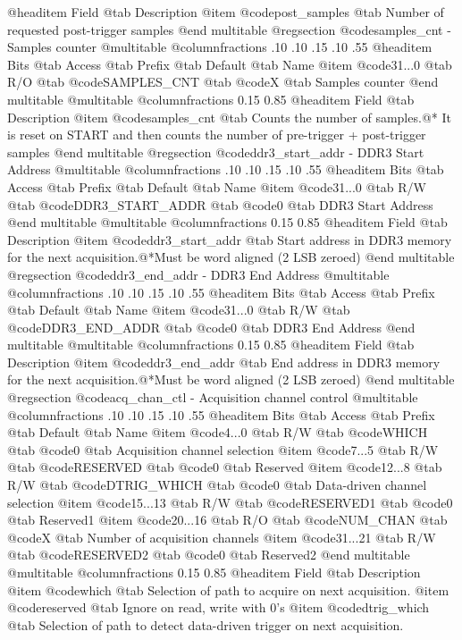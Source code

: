 @headitem Field @tab Description
@item @code{post_samples} @tab Number of requested post-trigger samples
@end multitable
@regsection @code{samples_cnt} - Samples counter
@multitable @columnfractions .10 .10 .15 .10 .55
@headitem Bits @tab Access @tab Prefix @tab Default @tab Name
@item @code{31...0}
@tab R/O @tab
@code{SAMPLES_CNT}
@tab @code{X} @tab 
Samples counter
@end multitable
@multitable @columnfractions 0.15 0.85
@headitem Field @tab Description
@item @code{samples_cnt} @tab Counts the number of samples.@* It is reset on START and then counts the number of pre-trigger + post-trigger samples
@end multitable
@regsection @code{ddr3_start_addr} - DDR3 Start Address
@multitable @columnfractions .10 .10 .15 .10 .55
@headitem Bits @tab Access @tab Prefix @tab Default @tab Name
@item @code{31...0}
@tab R/W @tab
@code{DDR3_START_ADDR}
@tab @code{0} @tab 
DDR3 Start Address
@end multitable
@multitable @columnfractions 0.15 0.85
@headitem Field @tab Description
@item @code{ddr3_start_addr} @tab Start address in DDR3 memory for the next acquisition.@*Must be word aligned (2 LSB zeroed)
@end multitable
@regsection @code{ddr3_end_addr} - DDR3 End Address
@multitable @columnfractions .10 .10 .15 .10 .55
@headitem Bits @tab Access @tab Prefix @tab Default @tab Name
@item @code{31...0}
@tab R/W @tab
@code{DDR3_END_ADDR}
@tab @code{0} @tab 
DDR3 End Address
@end multitable
@multitable @columnfractions 0.15 0.85
@headitem Field @tab Description
@item @code{ddr3_end_addr} @tab End address in DDR3 memory for the next acquisition.@*Must be word aligned (2 LSB zeroed)
@end multitable
@regsection @code{acq_chan_ctl} - Acquisition channel control
@multitable @columnfractions .10 .10 .15 .10 .55
@headitem Bits @tab Access @tab Prefix @tab Default @tab Name
@item @code{4...0}
@tab R/W @tab
@code{WHICH}
@tab @code{0} @tab 
Acquisition channel selection
@item @code{7...5}
@tab R/W @tab
@code{RESERVED}
@tab @code{0} @tab 
Reserved
@item @code{12...8}
@tab R/W @tab
@code{DTRIG_WHICH}
@tab @code{0} @tab 
Data-driven channel selection
@item @code{15...13}
@tab R/W @tab
@code{RESERVED1}
@tab @code{0} @tab 
Reserved1
@item @code{20...16}
@tab R/O @tab
@code{NUM_CHAN}
@tab @code{X} @tab 
Number of acquisition channels
@item @code{31...21}
@tab R/W @tab
@code{RESERVED2}
@tab @code{0} @tab 
Reserved2
@end multitable
@multitable @columnfractions 0.15 0.85
@headitem Field @tab Description
@item @code{which} @tab Selection of path to acquire on next acquisition.
@item @code{reserved} @tab Ignore on read, write with 0's
@item @code{dtrig_which} @tab Selection of path to detect data-driven trigger on next acquisition.
